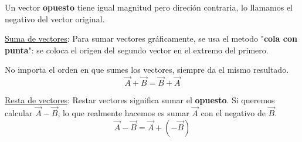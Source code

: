 \documentclass{article}
\newcommand{\bl}[1]{\textbf{#1}}
\begin{document}
    \begin{multicols}{2}
        \centering

        \begin{minipage}[t]{0.6\textwidth}

            \par Un vector \bl{opuesto} tiene igual magnitud pero direción contraria, lo llamamos el negativo del vector original.

        \end{minipage}
        \hfill
        \columnbreak
        \begin{minipage}[t]{0.3\textwidth}

            \begin{figure}[H]
                \centering
                \shorthandoff{>}
                \shorthandon{>}
            \end{figure}

        \end{minipage}
        
    \end{multicols}

    \par \underline{Suma de vectores}: Para sumar vectores gráficamente, se usa el metodo "\bl{cola con punta}": se coloca el origen del segundo vector en el extremo del primero.
    \begin{figure}[H]
        \centering
        \shorthandoff{>}
        \shorthandon{>}
    \end{figure}

    \par No importa el orden en que sumes los vectores, siempre da el mismo resultado.
    \[ \vec{A}+\vec{B}=\vec{B}+\vec{A} \]

    \par \underline{Resta de vectores}: Restar vectores significa sumar el \bl{opuesto}. Si queremos calcular \(\vec{A}-\vec{B}\), lo que realmente hacemos es sumar \(\vec{A}\) con el negativo de \(\vec{B}\).
    \[ \vec{A}-\vec{B}=\vec{A}+(-\vec{B}) \]
\end{document}
